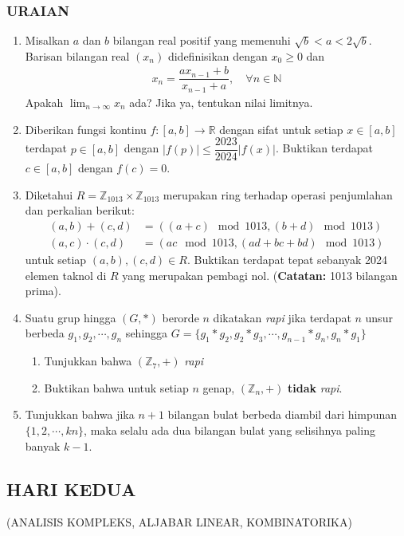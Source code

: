 \documentclass[12pt,twoside]{article}
\newcommand{\R}{\mathbb{R}}
\begin{document}
\subsubsection*{URAIAN}
\begin{enumerate}
	\item  Misalkan $a$ dan $b$ bilangan real positif yang memenuhi $\sqrt{b}<a<2\sqrt{b}$. Barisan bilangan real $(x_n)$ didefinisikan dengan $x_0\geq 0$ dan
	      \begin{align*}
		      x_n = \dfrac{ax_{n-1}+b}{x_{n-1}+a}, \quad \forall n\in\mathbb{N}
	      \end{align*}
	      Apakah $\displaystyle\lim_{n\rightarrow\infty} x_n$ ada? Jika ya, tentukan nilai limitnya.
	\item Diberikan fungsi kontinu $f:[a,b]\rightarrow \R$ dengan sifat untuk setiap $x\in[a,b]$ terdapat $p\in[a,b]$ dengan $|f(p)|\leq \dfrac{2023}{2024}|f(x)|$. Buktikan terdapat $c\in[a,b]$ dengan $f(c)=0$.
	\item Diketahui $R=\mathbb{Z}_{1013}\times \mathbb{Z}_{1013}$ merupakan ring terhadap operasi penjumlahan dan perkalian berikut:
	      \begin{align*}
		      (a,b)+(c,d)      & = ((a+c) \mod 1013, (b+d)\mod 1013)   \\
		      (a,c)\cdot (c,d) & = ( ac\mod 1013, (ad+bc+bd)\mod 1013)
	      \end{align*}
	      untuk setiap $(a,b),(c,d)\in R$. Buktikan terdapat tepat sebanyak 2024 elemen taknol di $R$ yang merupakan pembagi nol. (\textbf{Catatan:} 1013 bilangan prima).
	\item Suatu grup hingga $(G,\ast)$ berorde $n$ dikatakan \textit{rapi} jika terdapat $n$ unsur berbeda $g_1,g_2,\cdots, g_n$ sehingga $G=\{g_1\ast g_2, g_2\ast g_3,\cdots, g_{n-1}\ast g_n, g_n\ast g_1\}$
	      \begin{enumerate}
		      \item  Tunjukkan bahwa $(\mathbb{Z}_7, +)$ \textit{rapi}
		      \item Buktikan bahwa untuk setiap $n$ genap, $(\mathbb{Z}_n, +)$ \textbf{tidak} \textit{rapi}.
	      \end{enumerate}
	\item Tunjukkan bahwa jika $n+1$ bilangan bulat berbeda diambil dari himpunan $\{1,2,\cdots, kn\}$, maka selalu ada dua bilangan bulat yang selisihnya paling banyak $k-1$.
\end{enumerate}
\newpage
\subsection{HARI KEDUA}
\begin{center}
	(ANALISIS KOMPLEKS, ALJABAR LINEAR, KOMBINATORIKA)
\end{center}
\end{document}
